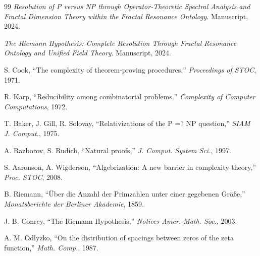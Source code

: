 \begin{thebibliography}{99}
\textit{Resolution of P versus NP through Operator-Theoretic Spectral Analysis and Fractal Dimension Theory within the Fractal Resonance Ontology}. Manuscript, 2024.

\textit{The Riemann Hypothesis: Complete Resolution Through Fractal Resonance Ontology and Unified Field Theory}. Manuscript, 2024.

S. Cook, ``The complexity of theorem-proving procedures,'' \textit{Proceedings of STOC}, 1971.

R. Karp, ``Reducibility among combinatorial problems,'' \textit{Complexity of Computer Computations}, 1972.

T. Baker, J. Gill, R. Solovay, ``Relativizations of the P =? NP question,'' \textit{SIAM J. Comput.}, 1975.

A. Razborov, S. Rudich, ``Natural proofs,'' \textit{J. Comput. System Sci.}, 1997.

S. Aaronson, A. Wigderson, ``Algebrization: A new barrier in complexity theory,'' \textit{Proc. STOC}, 2008.

B. Riemann, ``Über die Anzahl der Primzahlen unter einer gegebenen Größe,'' \textit{Monatsberichte der Berliner Akademie}, 1859.

J. B. Conrey, ``The Riemann Hypothesis,'' \textit{Notices Amer. Math. Soc.}, 2003.

A. M. Odlyzko, ``On the distribution of spacings between zeros of the zeta function,'' \textit{Math. Comp.}, 1987.
\end{thebibliography}
